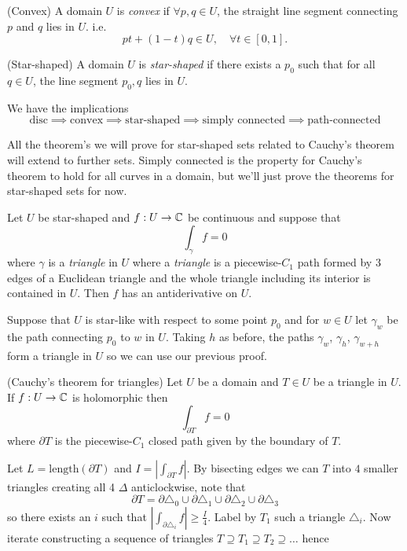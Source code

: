 \documentclass{article}
\begin{document}
\begin{definition}
	(Convex) A domain $ U $ is \textit{convex} if $ \forall p,q\in U $, the straight line segment connecting $ p $ and $ q $ lies in $ U $. i.e.
	\[
		pt+(1-t)q \in U,\quad\forall t\in[0,1].
	\]
\end{definition}
\begin{definition}
	(Star-shaped) A domain $ U $ is \textit{star-shaped} if there exists a $ p_0 $ such that for all $ q\in U $, the line segment $ p_0, q$ lies in $ U $.
\end{definition}
We have the implications
\[
	\text{disc} \implies \text{convex}\implies \text{star-shaped}\implies \text{simply connected} \implies \text{path-connected}
\]
\begin{remark}
	All the theorem's we will prove for star-shaped sets related to Cauchy's theorem will extend to further sets. Simply connected is the property for Cauchy's theorem to hold for all curves in a domain, but we'll just prove the theorems for star-shaped sets for now.
\end{remark}
\begin{lemma}
  Let $ U $ be star-shaped and $ f:U\to \mathbb{C} $ be continuous and suppose that
  \[
    \int_\gamma f = 0
  \]
  where $ \gamma $ is a \textit{triangle} in $ U $ where a \textit{triangle} is a piecewise-$ C_1 $ path formed by $ 3 $ edges of a Euclidean triangle and the whole triangle including its interior is contained in $ U $. Then $ f $ has an antiderivative on $ U $.
\end{lemma}
\pf Suppose that $ U $ is star-like with respect to some point $ p_0 $ and for $ w\in U $ let $ \gamma_w $ be the path connecting $ p_0 $ to $ w $ in $ U $. Taking $ h $ as before, the paths $ \gamma_w $, $ \gamma_h $, $ \gamma_{w+h} $ form a triangle in $ U $ so we can use our previous proof.
\begin{theorem}
	(Cauchy's theorem for triangles) Let $ U $ be a domain and $ T\in U $ be a triangle in $ U $. If $ f: U \to \mathbb{C} $ is holomorphic then
	\[
		\int_{\partial T} f = 0
	\]
	where $ \partial T $ is the piecewise-$ C_1 $ closed path given by the boundary of $ T $.
\end{theorem}
\pf Let $ L = \mathrm {length} (\partial T) $ and $ I = \left|\int_{\partial T} f\right| $. By bisecting edges we can $ T $ into $ 4 $ smaller triangles creating all 4 $ \Delta $ anticlockwise, note that
\[
  \partial T = \partial \triangle_0 \cup \partial \triangle_1 \cup \partial\triangle_2 \cup \partial \triangle_3
\]
so there exists an $ i $ such that $ \left| \int_{\partial \triangle_i} f\right| \ge \frac I4 $. Label by $ T_1 $ such a triangle $ \triangle_i $. Now iterate constructing a sequence of triangles $ T\supseteq T_1\supseteq T_2\supseteq \dots $ hence
\end{document}
